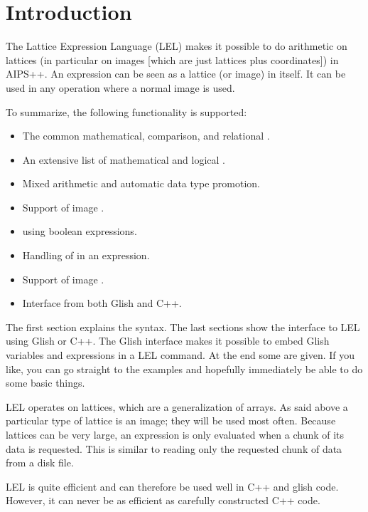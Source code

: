
\section{Introduction}

The Lattice Expression Language (LEL) makes it possible to do arithmetic
on lattices (in particular on images [which are just lattices plus
coordinates]) in AIPS++.  An expression can be seen as a lattice (or
image) in itself.  It can be used in any operation where a normal image
is used. 

To summarize, the following functionality is supported:
\begin{itemize}
\item The common mathematical, comparison, and relational
      .
\item An extensive list of mathematical and logical
      .
\item Mixed  arithmetic
      and automatic data type promotion.
\item Support of image .
\item {} using boolean expressions.
\item Handling of  in an expression.
\item Support of image .
\item Interface from both Glish and C++.
\end{itemize}

The first section explains the syntax.  The last sections show the
interface to LEL using Glish or C++.  The Glish interface makes it
possible to embed Glish variables and expressions in a LEL command. 
At the end some  are given.  If 
you like, you can go straight to the examples and hopefully immediately
be able to do some basic things.

\medskip\noindent LEL operates on lattices, which are a generalization
of arrays.  As said above a particular type of lattice is an image; they
will be used most often.  Because lattices can be very large, an
expression is only evaluated when a chunk of its data is requested. 
This is similar to reading only the requested chunk of data from a disk
file. 

\medskip\noindent LEL is quite efficient and can therefore be used well
in C++ and glish code.  However, it can never be as efficient as
carefully constructed C++ code. 

